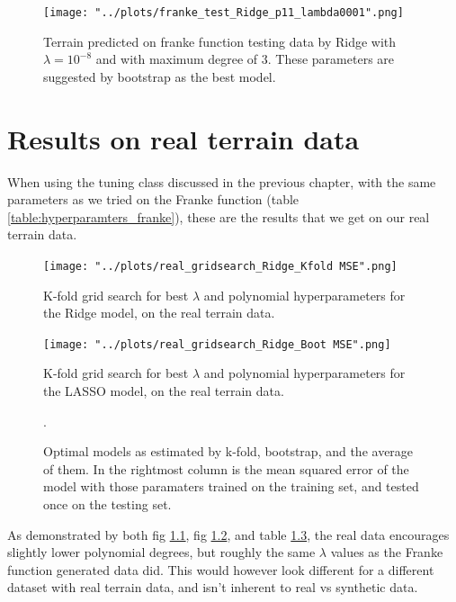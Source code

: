 \documentclass[11pt, a4paper]{report}
\begin{document}
\begin{figure}
\texttt{[image: "../plots/franke\_test\_Ridge\_p11\_lambda0001".png]}
\caption{Terrain predicted on franke function testing data by Ridge with $\lambda = 10^{-8}$ and with maximum degree of $3$. These parameters are suggested by bootstrap as the best model.}
\label{fig:ridge_bootstrap_best}
\end{figure}


\chapter{Results on real terrain data}

When using the tuning class discussed in the previous chapter, with the same parameters as we tried on the Franke function (table \ref{table:hyperparamters_franke}), these are the results that we get on our real terrain data.

\begin{figure}
\texttt{[image: "../plots/real\_gridsearch\_Ridge\_Kfold MSE".png]}
\caption{K-fold grid search for best $\lambda$ and polynomial hyperparameters for the Ridge model, on the real terrain data.}
\label{fig:grid_ridge_kfold_real}
\end{figure}

\begin{figure}
\texttt{[image: "../plots/real\_gridsearch\_Ridge\_Boot MSE".png]}
\caption{K-fold grid search for best $\lambda$ and polynomial hyperparameters for the LASSO model, on the real terrain data.}
\label{fig:grid_ridge_boot_real}
\end{figure}

\begin{figure}
\begin{center}
\caption{Optimal models as estimated by k-fold, bootstrap, and the average of them. In the rightmost column is the mean squared error of the model with those paramaters trained on the training set, and tested once on the testing set.} 
.
\label{table:optimal_models_real}
\end{center}
\end{figure}

As demonstrated by both fig \ref{fig:grid_ridge_kfold_real}, fig \ref{fig:grid_ridge_boot_real}, and table \ref{table:optimal_models_real}, the real data encourages slightly lower polynomial degrees, but roughly the same $\lambda$ values as the Franke function generated data did. This would however look different for a different dataset with real terrain data, and isn't inherent to real vs synthetic data.
\end{document}
